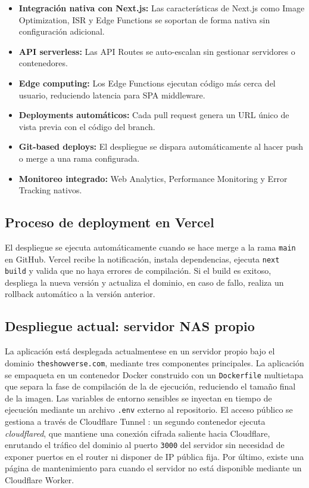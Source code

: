 \begin{itemize}
\item \textbf{Integración nativa con Next.js:} Las características de Next.js como Image Optimization, ISR \parencite{Vercel:2024c} y Edge Functions \parencite{Vercel:2024b} se soportan de forma nativa sin configuración adicional.
\item \textbf{API serverless:} Las API Routes se auto-escalan sin gestionar servidores o contenedores.
\item \textbf{Edge computing:} Los Edge Functions ejecutan código más cerca del usuario, reduciendo latencia para SPA middleware.
\item \textbf{Deployments automáticos:} Cada pull request genera un URL único de vista previa con el código del branch.
\item \textbf{Git-based deploys:} El despliegue se dispara automáticamente al hacer push o merge a una rama configurada.
\item \textbf{Monitoreo integrado:} Web Analytics, Performance Monitoring y Error Tracking nativos.
\end{itemize}

\subsection{Proceso de deployment en Vercel}

El despliegue se ejecuta automáticamente cuando se hace merge a la rama \texttt{main} en GitHub. Vercel recibe la notificación, instala dependencias, ejecuta \texttt{next build} y valida que no haya errores de compilación. Si el build es exitoso, despliega la nueva versión y actualiza el dominio, en caso de fallo, realiza un rollback automático a la versión anterior.

\subsection{Despliegue actual: servidor NAS propio}

La aplicación está desplegada actualmentese en un servidor propio bajo el dominio \texttt{theshowverse.com}, mediante tres componentes principales. La aplicación se empaqueta en un contenedor Docker \parencite{Docker:2024} construido con un \texttt{Dockerfile} multietapa que separa la fase de compilación de la de ejecución, reduciendo el tamaño final de la imagen. Las variables de entorno sensibles se inyectan en tiempo de ejecución mediante un archivo \texttt{.env} externo al repositorio. El acceso público se gestiona a través de Cloudflare Tunnel \parencite{Cloudflare:2024}: un segundo contenedor ejecuta \textit{cloudflared}, que mantiene una conexión cifrada saliente hacia Cloudflare, enrutando el tráfico del dominio al puerto \texttt{3000} del servidor sin necesidad de exponer puertos en el router ni disponer de IP pública fija. Por último, existe una página de mantenimiento para cuando el servidor no está disponible mediante un Cloudflare Worker.

